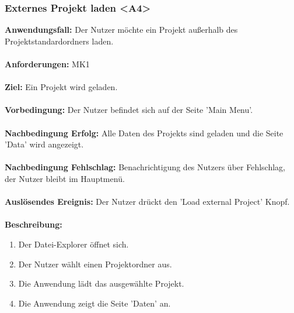 \documentclass[parskip=full]{scrartcl} %
\begin{document}
\subsubsection*{Externes Projekt laden <A4>}
\textbf{Anwendungsfall:} Der Nutzer möchte ein Projekt außerhalb des Projektstandardordners laden.\\\\
\textbf{Anforderungen:} MK1\\\\
\textbf{Ziel:} Ein Projekt wird geladen. \\\\
\textbf{Vorbedingung:} Der Nutzer befindet sich auf der Seite 'Main Menu'.  \\\\
\textbf{Nachbedingung Erfolg:} Alle Daten des Projekts sind geladen und die Seite 'Data' wird angezeigt. \\\\
\textbf{Nachbedingung Fehlschlag:} Benachrichtigung des Nutzers über Fehlschlag, der Nutzer bleibt im Hauptmenü. \\\\
\textbf{Auslösendes Ereignis:}  Der Nutzer drückt den 'Load external Project' Knopf. \\\\
\textbf{Beschreibung:}
\begin{enumerate}
    \item Der Datei-Explorer öffnet sich.
    \item Der Nutzer wählt einen Projektordner aus.
    \item Die Anwendung lädt das ausgewählte Projekt.
    \item Die Anwendung zeigt die Seite 'Daten' an.
\end{enumerate}
\newpage
\end{document}
